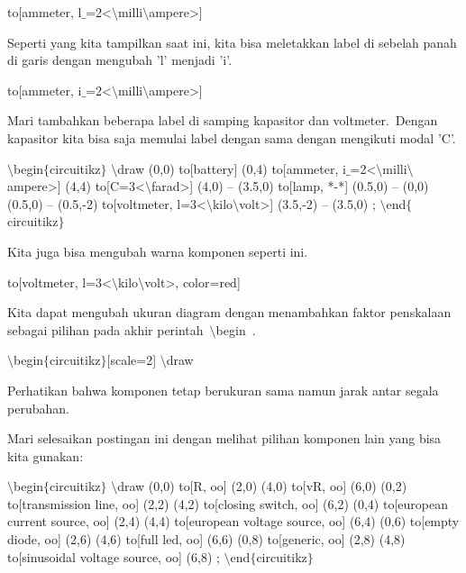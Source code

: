 \noindent 
 to[ammeter, l$ \_ $=2<$\setminus$milli$\setminus$ampere>] 
\par


\noindent 
Seperti yang kita tampilkan saat ini, kita bisa meletakkan label di sebelah panah di garis dengan mengubah 'l' menjadi 'i'.
\par


\noindent 
 to[ammeter, i$ \_ $=2<$\setminus$milli$\setminus$ampere>] 
\par


\noindent 
Mari tambahkan beberapa label di samping kapasitor dan voltmeter. Dengan kapasitor kita bisa saja memulai label dengan sama dengan mengikuti modal 'C'.
\par


\noindent 
 $\setminus$begin$ \{ $circuitikz$ \} $ $\setminus$draw (0,0) to[battery] (0,4) to[ammeter, i$ \_ $=2<$\setminus$milli$\setminus$ampere>] (4,4) to[C=3<$\setminus$farad>] (4,0) -- (3.5,0) to[lamp, *-*] (0.5,0) -- (0,0) (0.5,0) -- (0.5,-2) to[voltmeter, l=3<$\setminus$kilo$\setminus$volt>] (3.5,-2) -- (3.5,0) ; $\setminus$end$ \{ $circuitikz$ \} $ 
\par


\noindent 
Kita juga bisa mengubah warna komponen seperti ini.
\par


\noindent 
 to[voltmeter, l=3<$\setminus$kilo$\setminus$volt>, color=red] 
\par


\noindent 
Kita dapat mengubah ukuran diagram dengan menambahkan faktor penskalaan sebagai pilihan pada akhir perintah $\setminus$begin .
\par


\noindent 
 $\setminus$begin$ \{ $circuitikz$ \} $[scale=2] $\setminus$draw 
\par


\noindent 
Perhatikan bahwa komponen tetap berukuran sama namun jarak antar segala perubahan.
\par


\noindent 
Mari selesaikan postingan ini dengan melihat pilihan komponen lain yang bisa kita gunakan:
\par


\noindent 
 $\setminus$begin$ \{ $circuitikz$ \} $ $\setminus$draw (0,0) to[R, oo] (2,0) (4,0) to[vR, oo] (6,0) (0,2) to[transmission line, oo] (2,2) (4,2) to[closing switch, oo] (6,2) (0,4) to[european current source, oo] (2,4) (4,4) to[european voltage source, oo] (6,4) (0,6) to[empty diode, oo] (2,6) (4,6) to[full led, oo] (6,6) (0,8) to[generic, oo] (2,8) (4,8) to[sinusoidal voltage source, oo] (6,8) ; $\setminus$end$ \{ $circuitikz$ \} $ 
\par


